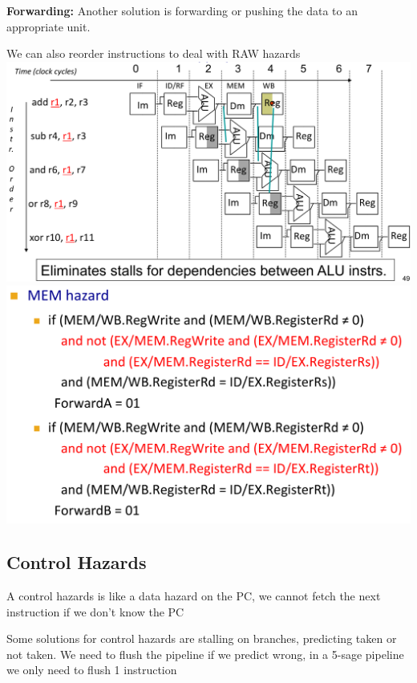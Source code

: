 \textbf{Forwarding:} Another solution is forwarding or pushing the data to an
appropriate unit.

We can also reorder instructions to deal with RAW hazards
\includegraphics[width=\linewidth]{png/forwarding.png}
\includegraphics[width=\linewidth]{png/forwardingcontrol.png}

\subsection*{Control Hazards}
A control hazards is like a data hazard on the PC, we cannot fetch the next
instruction if we don't know the PC

Some solutions for control hazards are stalling on branches, predicting taken
or not taken. We need to flush the pipeline if we predict wrong, in a 5-sage
pipeline we only need to flush 1 instruction
